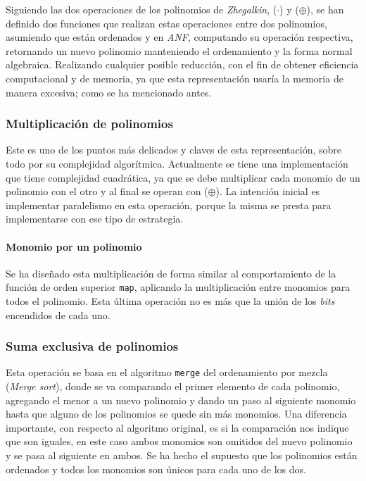 Siguiendo las dos operaciones de los polinomios de \textit{Zhegalkin}, ($\cdot$) y ($\oplus$), se han definido dos funciones que realizan estas operaciones entre dos polinomios, asumiendo que están ordenados y en \textit{ANF}, computando su operación respectiva, retornando un nuevo polinomio manteniendo el ordenamiento y la forma normal algebraica. Realizando cualquier posible reducción, con el fin de obtener eficiencia computacional y de memoria, ya que esta representación usaría la memoria de manera excesiva; como se ha mencionado antes.

\subsubsection{Multiplicación de polinomios}

Este es uno de los puntos más delicados y claves de esta representación, sobre todo por su complejidad algorítmica. Actualmente se tiene una implementación que tiene complejidad cuadrática, ya que se debe multiplicar cada monomio de un polinomio con el otro y al final se operan con ($\oplus$). La intención inicial es implementar paralelismo en esta operación, porque la misma se presta para implementarse con ese tipo de estrategia.

\paragraph{Monomio por un polinomio}
\label{sec:map}

Se ha diseñado esta multiplicación de forma similar al comportamiento de la función de orden superior \texttt{map}, aplicando la multiplicación entre monomios para todos el polinomio. Esta última operación no es más que la unión de los \textit{bits} encendidos de cada uno.

\subsubsection{Suma exclusiva de polinomios}

Esta operación se basa en el algoritmo \texttt{merge} del ordenamiento por mezcla (\textit{Merge sort}), donde se va comparando el primer elemento de cada polinomio, agregando el menor a un nuevo polinomio y dando un paso al siguiente monomio hasta que alguno de los polinomios se quede sin más monomios. Una diferencia importante, con respecto al algoritmo original, es si la comparación nos indique que son iguales, en este caso ambos monomios son omitidos del nuevo polinomio y se pasa al siguiente en ambos. Se ha hecho el supuesto que los polinomios están ordenados y todos los monomios son únicos para cada uno de los dos.
